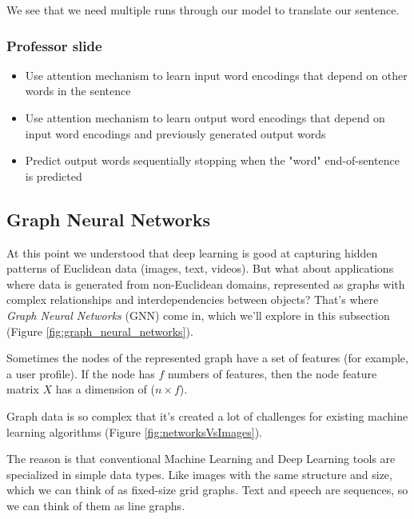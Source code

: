 We see that we need multiple runs through our model to translate our sentence.

\subsubsection{Professor slide}
\begin{itemize}
	\item Use attention mechanism to learn input word encodings that depend on other
		words in the sentence

	\item Use attention mechanism to learn output word encodings that depend on input
		word encodings and previously generated output words

	\item Predict output words sequentially stopping when the "word" end-of-sentence
		is predicted
\end{itemize}

\subsection{Graph Neural Networks}
At this point we understood that deep learning is good at capturing hidden
patterns of Euclidean data (images, text, videos). But what about applications where
data is generated from non-Euclidean domains, represented as graphs with complex
relationships and interdependencies between objects? That’s where \textit{Graph
Neural Networks} (GNN) come in, which we’ll explore in this subsection (Figure
\ref{fig:graph_neural_networks}).
\newline

Sometimes the nodes of the represented graph have a set of features (for example,
a user profile). If the node has $f$ numbers of features, then the node feature
matrix $X$ has a dimension of ($n \times f$).
\newline

Graph data is so complex that it’s created a lot of challenges for existing
machine learning algorithms (Figure \ref{fig:networksVsImages}).
\newline

The reason is that conventional Machine Learning and Deep Learning tools are
specialized in simple data types. Like images with the same structure and size,
which we can think of as fixed-size grid graphs. Text and speech are sequences,
so we can think of them as line graphs.
\newline

